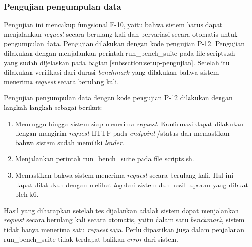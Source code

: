 \subsubsection{Pengujian pengumpulan data}
\label{subsubsection:pengujian-pengumpulan-data}

Pengujian ini mencakup fungsional F-10, yaitu bahwa sistem harus dapat menjalankan \textit{request} secara berulang kali dan bervariasi secara otomatis untuk pengumpulan data. Pengujian dilakukan dengan kode pengujian P-12. Pengujian dilakukan dengan menjalankan perintah run\_bench\_suite pada file scripts.sh yang sudah dijelaskan pada bagian \ref{subsection:setup-pengujian}. Setelah itu dilakukan verifikasi dari durasi \textit{benchmark} yang dilakukan bahwa sistem menerima \textit{request} secara berulang kali.

Pengujian pengumpulan data dengan kode pengujian P-12 dilakukan dengan langkah-langkah sebagai berikut:
\begin{enumerate}
    \item Menunggu hingga sistem siap menerima \textit{request}. Konfirmasi dapat dilakukan dengan mengirim \textit{request} HTTP pada \textit{endpoint} /status dan memastikan bahwa sistem sudah memiliki \textit{leader}.
    \item Menjalankan perintah run\_bench\_suite pada file scripts.sh.
    \item Memastikan bahwa sistem menerima \textit{request} secara berulang kali. Hal ini dapat dilakukan dengan melihat \textit{log} dari sistem dan hasil laporan yang dibuat oleh k6.
\end{enumerate}

Hasil yang diharapkan setelah tes dijalankan adalah sistem dapat menjalankan \textit{request} secara berulang kali secara otomatis, yaitu dalam satu \textit{benchmark}, sistem tidak hanya menerima satu \textit{request} saja. Perlu dipastikan juga dalam penjalanan run\_bench\_suite tidak terdapat balikan \textit{error} dari sistem.